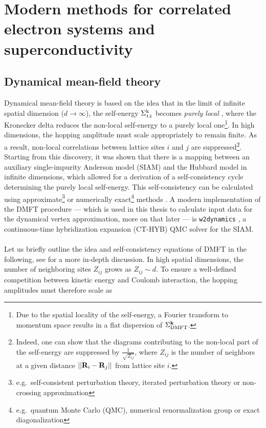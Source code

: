 \documentclass[../../main.tex]{subfiles}
\begin{document}

\chapter{Modern methods for correlated electron systems and superconductivity}\label{ch:modern_methods}

\section{Dynamical mean-field theory}\label{sec:dmft}

Dynamical mean-field theory is based on the idea that in the limit of infinite spatial dimension ($d\to\infty$), the self-energy $\Sigma_{\mathfrak{12}}^{\text{k}}$ becomes \textit{purely local} \cite{Metzner1989}, where the Kronecker delta reduces the non-local self-energy to a purely local one\footnote{Due to the spatial locality of the self-energy, a Fourier transform to momentum space results in a flat dispersion of $\Sigma_{\text{DMFT}}^{\textbf{k}}$.}. In high dimensions, the hopping amplitude must scale appropriately to remain finite. As a result, non-local correlations between lattice sites $i$ and $j$ are suppressed\footnote{Indeed, one can show that the diagrams contributing to the non-local part of the self-energy are suppressed by $\frac{1}{\sqrt{Z_{ij}}}$, where $Z_{ij}$ is the number of neighbors at a given distance $||\textbf{R}_i-\textbf{R}_j||$ from lattice site $i$.}. Starting from this discovery, it was shown \cite{Georges1992} that there is a mapping between an auxiliary single-impurity Anderson model (SIAM) and the Hubbard model in infinite dimensions, which allowed for a derivation of a self-consistency cycle determining the purely local self-energy. This self-consistency can be calculated using approximate\footnote{e.g.\ self-consistent perturbation theory, iterated perturbation theory or non-crossing approximation} or numerically exact\footnote{e.g.\ quantum Monte Carlo (QMC), numerical renormalization group or exact diagonalization} methods \cite{Held2007, Vollhardt2020}. A modern implementation of the DMFT procedure --- which is used in this thesis to calculate input data for the dynamical vertex approximation, more on that later --- is \texttt{w2dynamics} \cite{Wallerberger2019}, a continuous-time hybridization expansion (CT-HYB) QMC solver for the SIAM.
\\\\
Let us briefly outline the idea and self-consistency equations of DMFT in the following, see \cite{Held2007} for a more in-depth discussion. In high spatial dimensions, the number of neighboring sites $Z_{ij}$ grows as $Z_{ij}\sim d$. To ensure a well-defined competition between kinetic energy and Coulomb interaction, the hopping amplitudes must therefore scale as
\end{document}
